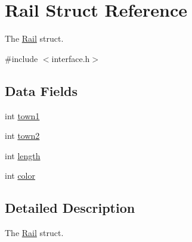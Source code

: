 \hypertarget{structRail}{\section{Rail Struct Reference}
\label{structRail}
}


The \hyperlink{structRail}{Rail} struct.  




{\ttfamily \#include $<$interface.\-h$>$}

\subsection*{Data Fields}
\begin{DoxyCompactItemize}
\item 
int \hyperlink{structRail_a98fff246793d7da82f5befd043b04451}{town1}
\item 
int \hyperlink{structRail_a38f94b482519ddfc27b054eb3dde308e}{town2}
\item 
int \hyperlink{structRail_a9f59b34b1f25fe00023291b678246bcc}{length}
\item 
int \hyperlink{structRail_a0fd02fb9277ffcb35a75066ffe95e8c7}{color}
\end{DoxyCompactItemize}


\subsection{Detailed Description}
The \hyperlink{structRail}{Rail} struct. 

